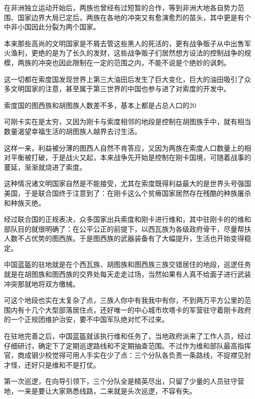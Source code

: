 在非洲独立运动开始后，两族也曾经有过短暂的合作，等到非洲大地各自势力范围、国家边界大局已定后，两族在各地的冲突又有愈演愈烈的苗头，其中更是有个中非小国因此分裂为两个国家。

本来那些高尚的文明国家是不屑去管这些黑人的死活的，更有战争贩子从中出售军火渔利，更绝的是为了长久的发财，这些战争贩子们居然想方设法的控制战争的规模，两族的冲突也因此限制在一定的范围之内，不能不说是个绝妙的讽刺。

这一切都在索度国发现世界上第三大油田后发生了巨大变化，巨大的油田吸引了众多文明国家的注意，甚至属于第三世界的中国也参与进了对索度的开发中。

索度国的图西族和胡图族人数差不多，基本上都是占总人口的20%

可刚卡实在是太穷，又因为刚卡与索度相邻的地段是控制在胡图族手中，就有相当数量渴望幸福生活的胡图族人越界去讨生活。

这样一来，利益被分薄的图西人自然不肯答应，又因为两族在索度人口数量上的相对平衡被打破，于是战火又起，本来战争先开始是控制在刚卡国境，可随着战事的蔓延，渐渐就烧进了索度。

这种情况诸文明国家自然是不能接受，尤其在索度既得利益最大的是世界头号强国美国，于是联合国终于注意到了：在刚卡这么个贫瘠国家居然存在残酷的种族屠杀和种族灭绝。

经过联合国的正规表决，众多国家出兵索度和刚卡进行维和，其中驻刚卡的的维和部队目的就很明确了：在公平公正的前提下，以西瓦族为各级政府骨干，尽量帮扶人数不占优势的图西族。于是图西族的武器装备有了大幅提升，生活也开始变得稳定。

中国蓝盔的驻地就是在个西瓦族、胡图族和图西族三族交错居住的地段，巡逻任务就是在胡图族和图西族的交界处每天走走过场，当然如果有人真不给面子进行武装冲突那就地将双方缴械。

可这个地段也实在太复杂了点，三族人你中有我我中有你，不到两万平方公里的范围内有十几个大型部落居住点，还好唯一的中心城市坎塔卡的军营驻守着刚卡政府的一个正规团维护治安，要不中国军队绝对忙不过来。

在驻地完善之后，中国蓝盔就该执行维和任务了，当地政府派来了工作人员，经过仔细研讨，确定下了定期巡逻路线和不定期抽查范围。不过作为维和部队最高指挥官，商成钢少校觉得可用人手实在少了点：三个分队各负责一条路线，不捉襟见肘才怪，还好只是维和不是打仗。

第一次巡逻，在向导引领下，三个分队全是精英尽出，只留了少量的人员驻守营地，一来是要让大家熟悉线路，二来就是头次巡逻，不容有失。

